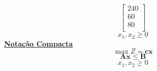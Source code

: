 \documentclass{beamer}
\begin{document}
\begin{frame}
\begin{columns}
\begin{column}{0.5\textwidth}
{\begin{equation*}
{{\begin{bmatrix}
										240 \\
										60 \\
										80 \\
									\end{bmatrix}
								}}
				\end{equation*}
				\begin{equation*}
				x_1, x_2 \ge 0 
				\end{equation*}
			}
			\only<3>
			{
				\centering
				\underline{\textbf{Notação Compacta}}
				\begin{equation*}
					\max Z = \mathbf{cx}
				\end{equation*} 
				\begin{equation*}
					\mathbf{Ax} \le \mathbf{B}
				\end{equation*}
				\begin{equation*}
					x_1, x_2 \ge 0 
				\end{equation*}
			}
		\end{column}
	\end{columns}		
\end{frame}
\end{document}
